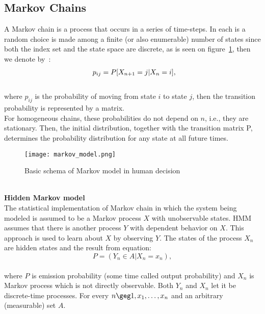 \subsection{Markov Chains} \label{subsec:chain}
A Markov chain is a process that occurs in a series of time-steps.
In each is a random choice is made among a finite (or also enumerable) number of states since both  the index set and
the state space are discrete, as is seen on figure~\ref{markovmodel}, then we denote by~\cite{patel}:\\
\begin{equation} \label{eq:7}
\begin{array}{l@{}l}
	p_{ij}=P[X_{n+1}=j|X_n=i],
\end{array}
\end{equation}\\
where $p_{ij}$ is the probability of moving from state $i$ to state $j$, then the transition probability is represented by a matrix.\\
For homogeneous chains, these probabilities do not depend on $n$, i.e., they are stationary.
Then, the initial distribution, together with the transition matrix P, determines the probability distribution for any state at all future times.\\
\begin{figure}[h!]
	\begin{center}
		\texttt{[image: markov\_model.png]}
	\end{center}
	\caption{Basic schema of Markov model in human decision~\cite{patel}}
	\label{markovmodel}
\end{figure}\\
\textbf{Hidden Markov model} \label{subsec:hmm}\\
The statistical implementation of Markov chain in which the system being modeled is assumed to be a Markov process $X$ with unobservable states.
HMM assumes that there is another process $Y$ with dependent behavior on $X$.
This approach is used to learn about $X$ by observing $Y$.
The states of the process $X_n$ are hidden states and the result from equation:\\
\begin{equation} \label{eq:8}
P = (Y_n ∈ A|X_n = x_n),
\end{equation}\\
where $P$ is emission probability (some time called output probability) and $X_n$ is Markov process which is not directly observable.
Both $Y_n$ and $X_n$ let it be discrete-time processes.
For every $n \geg 1, x_1,\ldots ,x_n$ and an arbitrary (measurable) set $A$.\\
